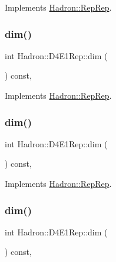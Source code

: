 Implements \mbox{\hyperlink{structHadron_1_1RepRep_a92c8802e5ed7afd7da43ccfd5b7cd92b}{Hadron\+::\+Rep\+Rep}}.

\mbox{\label{structHadron_1_1D4E1Rep_a4e11b2eaec3c949ef3d8b7c391078e84}} 
\subsubsection{\texorpdfstring{dim()}{dim()}\hspace{0.1cm}{\footnotesize\ttfamily [3/5]}}
{\footnotesize\ttfamily int Hadron\+::\+D4\+E1\+Rep\+::dim (\begin{DoxyParamCaption}{ }\end{DoxyParamCaption}) const\hspace{0.3cm}{\ttfamily [inline]}, {\ttfamily [virtual]}}



Implements \mbox{\hyperlink{structHadron_1_1RepRep_a92c8802e5ed7afd7da43ccfd5b7cd92b}{Hadron\+::\+Rep\+Rep}}.

\mbox{\label{structHadron_1_1D4E1Rep_a4e11b2eaec3c949ef3d8b7c391078e84}} 
\subsubsection{\texorpdfstring{dim()}{dim()}\hspace{0.1cm}{\footnotesize\ttfamily [4/5]}}
{\footnotesize\ttfamily int Hadron\+::\+D4\+E1\+Rep\+::dim (\begin{DoxyParamCaption}{ }\end{DoxyParamCaption}) const\hspace{0.3cm}{\ttfamily [inline]}, {\ttfamily [virtual]}}



Implements \mbox{\hyperlink{structHadron_1_1RepRep_a92c8802e5ed7afd7da43ccfd5b7cd92b}{Hadron\+::\+Rep\+Rep}}.

\mbox{\label{structHadron_1_1D4E1Rep_a4e11b2eaec3c949ef3d8b7c391078e84}} 
\subsubsection{\texorpdfstring{dim()}{dim()}\hspace{0.1cm}{\footnotesize\ttfamily [5/5]}}
{\footnotesize\ttfamily int Hadron\+::\+D4\+E1\+Rep\+::dim (\begin{DoxyParamCaption}{ }\end{DoxyParamCaption}) const\hspace{0.3cm}{\ttfamily [inline]}, {\ttfamily [virtual]}}



